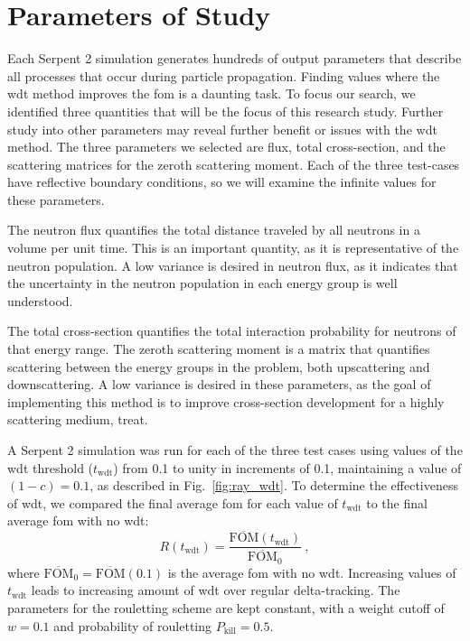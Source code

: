 \section{Parameters of Study}
\label{sec:parameters}
Each Serpent 2 simulation generates hundreds of output parameters that
describe all processes that occur during particle propagation. Finding
values where the \gls{wdt} method improves the \gls{fom} is a daunting
task. To focus our search, we identified three  quantities that
will be the focus of this research study. Further study into other
parameters may reveal further benefit or issues with the \gls{wdt}
method. The three parameters we selected are flux, 
total cross-section, and the scattering matrices for the
zeroth scattering moment. Each of the three test-cases have
reflective boundary conditions, so we will examine the infinite values for these
parameters.

The neutron flux quantifies the total distance traveled by all
neutrons in a volume per unit time. This is an important quantity, as
it is representative of the neutron population. A low variance is
desired in neutron flux, as it indicates that the uncertainty in the
neutron population in each energy group is well
understood.

The total cross-section quantifies the total interaction probability
for neutrons of that energy range. The zeroth scattering moment is a
matrix that quantifies scattering between the energy groups in the
problem, both upscattering and downscattering. A low variance is
desired in these parameters, as the goal of implementing this method
is to improve cross-section development for a highly scattering
medium, \gls{treat}.

A Serpent 2 simulation was run for each of the three test cases using
values of the \gls{wdt} threshold ($t_\mathrm{wdt}$) from 0.1 to unity in increments of
0.1, maintaining a value of $(1-c) = 0.1$, as described in
Fig.~\ref{fig:ray_wdt}. To determine the effectiveness of \gls{wdt},
we compared the final average \gls{fom} for each value of
$t_{\mathrm{wdt}}$ to the final average \gls{fom} with no \gls{wdt}:
\begin{equation*}
  R(t_{\mathrm{wdt}}) =
  \frac{\overline{\mathrm{FOM}}(t_\mathrm{wdt})}{\overline{\mathrm{FOM}}_0}\:,
\end{equation*}
where $\overline{\mathrm{FOM}}_0 =
\overline{\mathrm{FOM}}(0.1)$ is
the average \gls{fom} with no \gls{wdt}. Increasing values of
$t_{\mathrm{wdt}}$ leads to increasing amount of \gls{wdt} over
regular delta-tracking. The parameters for the rouletting scheme are
kept constant, with a weight cutoff of $w = 0.1$ and probability of
rouletting $P_{\mathrm{kill}} = 0.5$.


